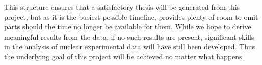 \documentclass[12pt,a4paper]{article}
\begin{document}
This structure ensures that a satisfactory thesis will be generated from this project, but as it is the busiest possible timeline, provides plenty of room to omit parts should the time no longer be available for them.
While we hope to derive meaningful results from the data, if no such results are present, significant skills in the analysis of nuclear experimental data will have still been developed.
Thus the underlying goal of this project will be achieved no matter what happens.

%


{}
\end{document}
